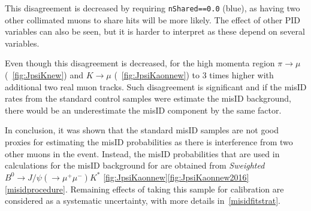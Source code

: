 
This disagreement is decreased by requiring \texttt{nShared==0.0} (blue), as having two other collimated muons to share hits will be more likely. The effect of other \gls{PID} variables can also be seen, but it is harder to interpret as these depend on several variables.

Even though this disagreement is decreased, for the high momenta region \DIFaddbegin {}\DIFaddend $\pi \rightarrow \mu$ (~\autoref{fig:JpsiKnew}) and $K \rightarrow \mu$ (~\autoref{fig:JpsiKaonnew}) \DIFdelbegin {}\DIFdelend \DIFaddbegin {} to 3 times higher with \DIFaddbegin {}\DIFaddend additional two real muon tracks. Such disagreement is significant and if the misID rates from the standard control samples were \DIFdelbegin {}\DIFdelend \DIFaddbegin {}\DIFaddend estimate the misID background, there would be an underestimate the misID component by the same factor.

In conclusion, it was shown that the standard misID samples are not good proxies for estimating the misID probabilities as there is interference from \DIFaddbegin {}\DIFaddend two other muons in the event. Instead, the misID probabilities that are used in calculations for the misID background for \Bmumumu are obtained from \textit{Sweighted} $B^{0} \rightarrow J/\psi(\rightarrow \mu^{+} \mu^{-}) K^{*}$ \DIFaddbegin {}\autoref{fig:JpsiKaonnew}\autoref{fig:JpsiKaonnew2016}\autoref{misidprocedure}\DIFaddend . Remaining effects of taking this sample for calibration are considered as a systematic uncertainty, with more details in~\autoref{misidfitstrat}.



